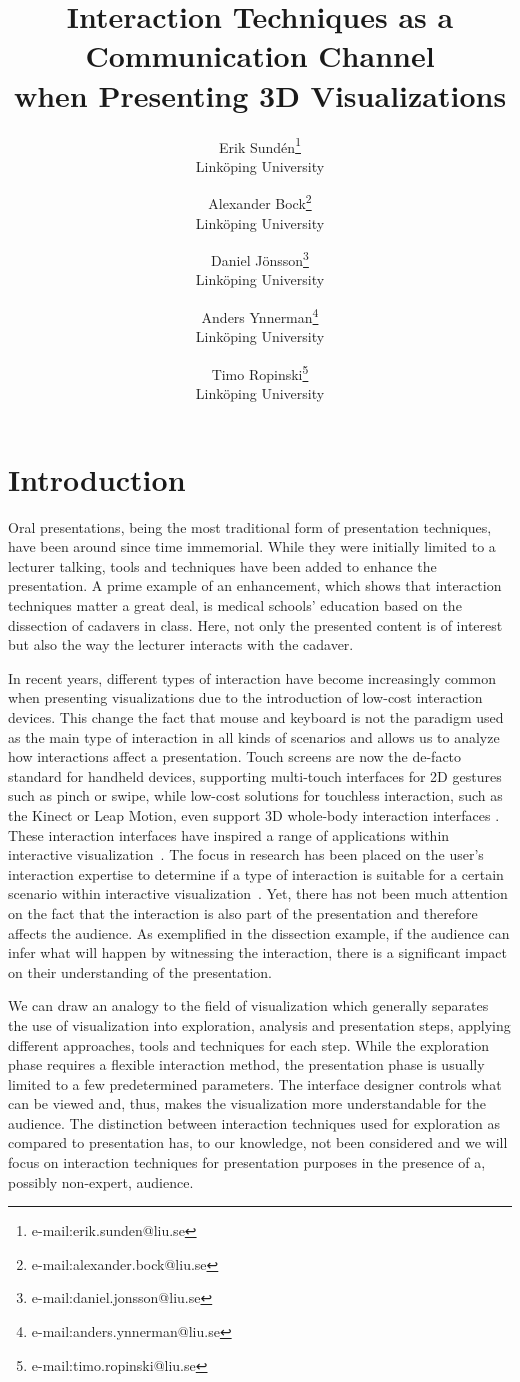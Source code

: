 \documentclass[journal]{vgtc}                %
\title{Interaction Techniques as a Communication Channel\\when Presenting 3D Visualizations} %
\author{Erik Sund\'en\thanks{e-mail:erik.sunden@liu.se}\\ %
        \scriptsize Link{\"o}ping University %
\and Alexander Bock\thanks{e-mail:alexander.bock@liu.se}\\ %
			   \scriptsize Link{\"o}ping University %
\and Daniel J\"onsson\thanks{e-mail:daniel.jonsson@liu.se}\\ %
          \scriptsize Link{\"o}ping University %
\and Anders Ynnerman\thanks{e-mail:anders.ynnerman@liu.se}\\ %
          \scriptsize Link{\"o}ping University %
\and Timo Ropinski\thanks{e-mail:timo.ropinski@liu.se}\\ %
           \scriptsize Link{\"o}ping University }
\begin{document}
\maketitle

\section{Introduction}\label{sec:introduction}
Oral presentations, being the most traditional form of presentation techniques, have been around since time immemorial.
While they were initially limited to a lecturer talking, tools and techniques have been added to enhance the presentation.
A prime example of an enhancement, which shows that interaction techniques matter a great deal, is medical schools' education based on the dissection of cadavers in class.
Here, not only the presented content is of interest but also the way the lecturer interacts with the cadaver.

In recent years, different types of interaction have become increasingly common when presenting visualizations due to the introduction of low-cost interaction devices.
This change the fact that mouse and keyboard is not the paradigm used as the main type of interaction in all kinds of scenarios and allows us to analyze how interactions affect a presentation.
Touch screens are now the de-facto standard for handheld devices, supporting multi-touch interfaces for 2D gestures such as pinch or swipe, while low-cost solutions for touchless interaction, such as the Kinect or Leap Motion, even support 3D whole-body interaction interfaces \cite{978-0-85729-432-6, Shoemaker:2010:BIT:1868914.1868967}. 
These interaction interfaces have inspired a range of applications within interactive visualization~\cite{zora82163, Jalaliniya:2013:TIM:2494091.2497332, OHaraGSPVMCCRDC14, 0724-4983}.
The focus in research has been placed on the user's interaction expertise to determine if a type of interaction is suitable for a certain scenario within interactive visualization~\cite{5693835, so64840, DBLP:journals/tvcg/YiKSJ07}.
Yet, there has not been much attention on the fact that the interaction is also part of the presentation and therefore affects the audience.
As exemplified in the dissection example, if the audience can infer what will happen by witnessing the interaction, there is a significant impact on their understanding of the presentation.

We can draw an analogy to the field of visualization which generally separates the use of visualization into exploration, analysis and presentation steps, applying different approaches, tools and techniques for each step.
While the exploration phase requires a flexible interaction method, the presentation phase is usually limited to a few predetermined parameters.
The interface designer controls what can be viewed and, thus, makes the visualization more understandable for the audience.
The distinction between interaction techniques used for exploration as compared to presentation has, to our knowledge, not been considered and we will focus on interaction techniques for presentation purposes in the presence of a, possibly non-expert, audience.
\end{document}
